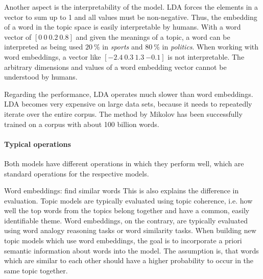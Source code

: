 \documentclass[
        a4paper,
        titlepage,
        twoside,
        parskip
        ]{scrbook}
\theoremstyle{break}
\begin{document}
Another aspect is the interpretability of the model.
LDA forces the elements in a vector to sum up to 1 and all values must be non-negative.
Thus, the embedding of a word in the topic space is easily interpretable by humans.
With a word vector of $[0~0~0.2~0.8]$ and given the meanings of a topic, a word can be interpreted as being used $20~\%$ in \emph{sports} and $80~\%$ in \emph{politics}.
When working with word embeddings, a vector like $[{-2.4}~0.3~1.3~{-0.1}]$ is not interpretable.
The arbitrary dimensions and values of a word embedding vector cannot be understood by humans.

Regarding the performance, LDA operates much slower than word embeddings.
LDA becomes very expensive on large data sets, because it needs to repeatedly iterate over the entire corpus.
The method by Mikolov has been successfully trained on a corpus with about 100 billion words.


\paragraph{Typical operations}
Both models have different operations in which they perform well, which are standard operations for the respective models.

Word embeddings: find similar words
This is also explains the difference in evaluation.
Topic models are typically evaluated using topic coherence, i.e. how well the top words from the topics belong together and have a common, easily identifiable theme.
Word embeddings, on the contrary, are typically evaluated using word analogy reasoning tasks or word similarity tasks.
When building new topic models which use word embeddings, the goal is to incorporate a priori semantic information about words into the model.
The assumption is, that words which are similar to each other should have a higher probability to occur in the same topic together.
\end{document}
